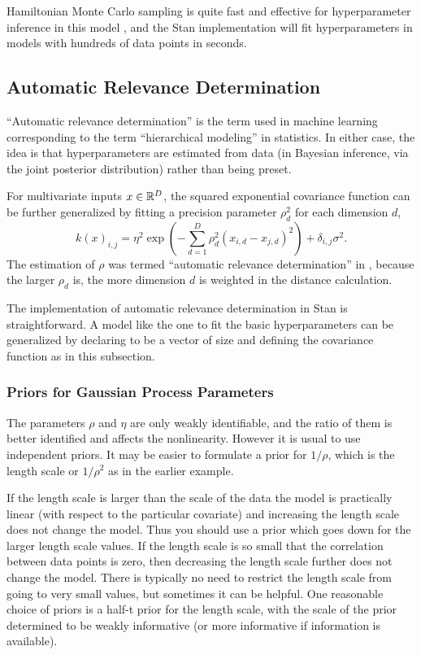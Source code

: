Hamiltonian Monte Carlo sampling is quite fast and effective for
hyperparameter inference in this model \citep{Neal:1997}, and the Stan
implementation will fit hyperparameters in models with hundreds of
data points in seconds.

\subsection{Automatic Relevance Determination}

``Automatic relevance determination'' is the term used in machine
learning corresponding to the term ``hierarchical modeling'' in
statistics.  In either case, the idea is that hyperparameters are
estimated from data (in Bayesian inference, via the joint posterior
distribution) rather than being preset.

For multivariate inputs $x \in \reals^D$, the squared exponential
covariance function can be further generalized by fitting a precision
parameter $\rho_d^2$ for each dimension $d$,
\[
k(x)_{i, j} = \eta^2 \exp 
\left(
- \sum_{d=1}^D \rho_d^2 (x_{i,d} - x_{j,d})^2
\right)
+ \delta_{i, j}\sigma^2.
\]
The estimation of $\rho$ was termed ``automatic relevance
determination'' in \citep{Neal:1996}, because the larger $\rho_d$ is,
the more dimension $d$ is weighted in the distance calculation.

The implementation of automatic relevance determination in Stan is
straightforward.  A model like the one to fit the basic
hyperparameters can be generalized by declaring  to be a
vector of size  and defining the covariance function as in
this subsection.


\subsubsection{Priors for Gaussian Process Parameters}

The parameters $\rho$ and $\eta$ are only weakly identifiable, and the
ratio of them is better identified and affects the
nonlinearity. However it is usual to use independent priors.  It may
be easier to formulate a prior for $1/\rho$, which is the length
scale or $1/\rho^2$ as in the earlier example.  

If the length scale is larger than the scale of the data the model is
practically linear (with respect to the particular covariate) and
increasing the length scale does not change the model. Thus you should
use a prior which goes down for the larger length scale values. If the
length scale is so small that the correlation between data points is
zero, then decreasing the length scale further does not change the
model. There is typically no need to restrict the length scale from
going to very small values, but sometimes it can be helpful.  One
reasonable choice of priors is a half-t prior for the length scale,
with the scale of the prior determined to be weakly informative (or
more informative if information is available).

